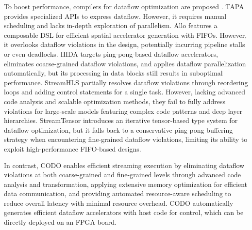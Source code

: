 \documentclass[conference]{IEEEtran}
\begin{document}
To boost performance, compilers for dataflow optimization are proposed \cite{guo2023tapa,ye2024hida, chen2024allo, streamhlsFPGA25, streamtensorMICRO25}.
TAPA \cite{guo2023tapa} provides specialized APIs to express dataflow. However, it requires manual scheduling and lacks in-depth exploration of parallelism. 
Allo \cite{chen2024allo} features a composable DSL for efficient spatial accelerator generation with FIFOs.
However, it overlooks dataflow violations in the design, potentially incurring pipeline stalls or even deadlocks.
HIDA \cite{ye2024hida} targets ping-pong-based dataflow accelerators, eliminates coarse-grained dataflow violations, and applies dataflow parallelization automatically, but its processing in data blocks still results in suboptimal performance.
StreamHLS \cite{streamhlsFPGA25} partially resolves dataflow violations through reordering loops and adding control statements for a single task. However, lacking advanced code analysis and scalable optimization methods, they fail to fully address violations for large-scale models featuring complex code patterns and deep layer hierarchies. 
StreamTensor \cite{streamtensorMICRO25} introduces an iterative tensor-based type system for dataflow optimization, but it falls back to a conservative ping-pong buffering strategy when encountering fine-grained dataflow violations, limiting its ability to exploit high-performance FIFO-based designs.

In contrast, CODO enables efficient streaming execution by eliminating dataflow violations at both coarse-grained and fine-grained levels through advanced code analysis and transformation, applying extensive memory optimization for efficient data communication, and providing automated resource-aware scheduling to reduce overall latency with minimal resource overhead. CODO automatically generates efficient dataflow accelerators with host code for control, which can be directly deployed on an FPGA board. 
\end{document}
